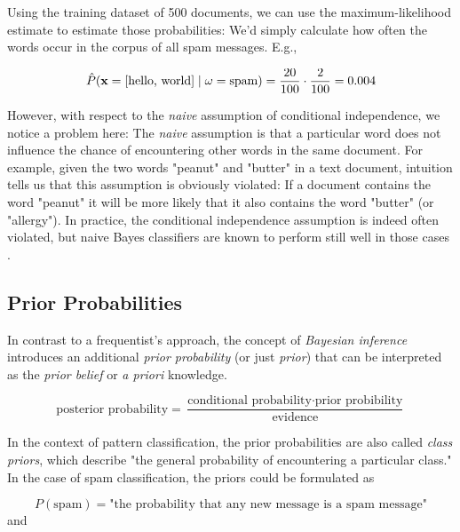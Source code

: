 \documentclass{article}
\begin{document}
Using the training dataset of 500 documents, we can use the maximum-likelihood estimate to estimate those probabilities: We'd simply calculate how often the words occur in the corpus of all spam messages. E.g., 


\begin{equation} \hat{P}(\textbf x=[\text{hello, world}] \mid \omega=\text{spam}) = \frac{20}{100} \cdot \frac{2}{100} = 0.004 \end{equation}

However, with respect to the \emph{naive} assumption of conditional independence, we notice a problem here: The \emph{naive} assumption is that a particular word does not influence the chance of encountering other words in the same document. For example, given the two words  "peanut" and "butter" in a text document, intuition tells us that this assumption is obviously violated: If a document contains the word "peanut" it will be more likely that it also contains the word "butter" (or "allergy"). In practice, the conditional independence assumption is indeed often violated, but naive Bayes classifiers are known to perform still well in those cases \cite{zhang2004optimality}.



\subsection{Prior Probabilities}
\label{sec:prior_probabilities_1}

In contrast to a frequentist's approach, the concept of \emph{Bayesian inference} introduces an additional \emph{prior probability} (or just \emph{prior})   that can be interpreted as the \emph{prior belief} or \emph{a priori} knowledge.

\begin{equation} \text{posterior probability} = \frac{\text{conditional probability} \cdot \text{prior probibility}}{\text{evidence}} \end{equation}

In the context of pattern classification, the prior probabilities are also called \emph{class priors}, which describe "the general probability of encountering a particular class." In the case of spam classification, the priors could be formulated as 

\begin{equation}P(\text{spam})=\text{"the probability that any new message is a spam message"} \end{equation} and 
\end{document}

